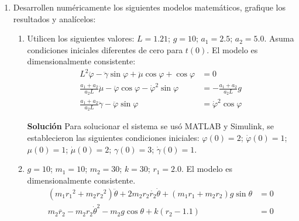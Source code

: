 \documentclass[letterpaper, 12pt]{article}
\begin{document}
\begin{enumerate}
\item Desarrollen numéricamente los siguientes modelos matemáticos, grafique los resultados y analícelos:
\begin{enumerate}
\item Utilicen los siguientes valores:
$L = 1.21$; $g = 10$; $a_1 = 2.5$; $a_2 = 5.0$. Asuma condiciones iniciales diferentes de cero para $t(0)$. El modelo es dimensionalmente consistente:
\begin{equation}
\begin{split}
    L^2\ddot{\varphi} - \ddot{\gamma}\sin \varphi + \ddot{\mu}\cos \varphi + \cos \varphi &= 0 \\
    \frac{a_1+a_2}{a_2L}\ddot{\mu} - \ddot{\varphi}\cos \varphi - \dot{\varphi}^2\sin \varphi &= - \frac{a_1+a_2}{a_2L}g \\
    \frac{a_1+a_2}{a_2L}\ddot{\gamma} - \ddot{\varphi}\sin \varphi &= \dot{\varphi}^2\cos \varphi
\end{split}
\end{equation}

\textbf{Solución}
Para solucionar el sistema se usó MATLAB y Simulink, se establecieron las siguientes condiciones iniciales:
$\varphi(0) = 2$; $\dot{\varphi}(0) = 1$; $\mu(0) = 1$; $\dot{\mu}(0) = 2$; $\gamma(0) = 3$; $\dot{\gamma}(0) = 1$.











\item $g = 10$; $m_1 = 10$; $m_2 = 30$; $k = 30$; $r_1 = 2.0$. El modelo es dimensionalmente consistente.
\begin{equation}
\begin{split}
    \left(m_1{r_1}^2 + m_2{r_2}^2\right)\ddot{\theta} + 2m_2r_2\dot{r_2}\dot{\theta} + \left(m_1r_1 + m_2r_2\right)g\sin \theta &= 0 \\
    m_2\ddot{r_2} - m_2r_2{\dot{\theta}}^2 - m_2g\cos \theta + k\left(r_2 - 1.1\right) &= 0
\end{split}
\end{equation}










\end{enumerate}
\end{enumerate}
\end{document}
